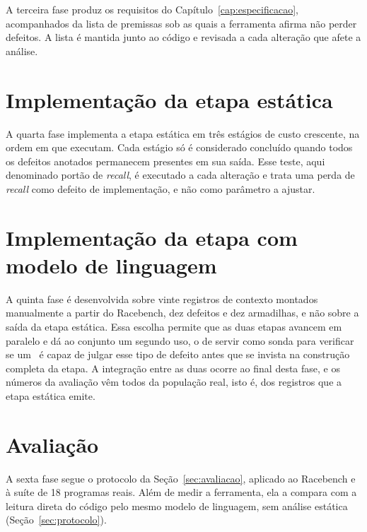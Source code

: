 A terceira fase produz os requisitos do Capítulo~\ref{cap:especificacao},
acompanhados da lista de premissas sob as quais a ferramenta afirma não perder
defeitos. A lista é mantida junto ao código e revisada a cada alteração que
afete a análise.

\section{Implementação da etapa estática}
\label{sec:fase-estatica}

A quarta fase implementa a etapa estática em três estágios de custo crescente,
na ordem em que executam. Cada estágio só é considerado concluído quando todos
os defeitos anotados permanecem presentes em sua saída. Esse teste, aqui
denominado portão de \textit{recall}, é executado a cada alteração e trata uma perda de
\textit{recall} como defeito de implementação, e não como parâmetro a ajustar.

\section{Implementação da etapa com modelo de linguagem}
\label{sec:fase-llm}

A quinta fase é desenvolvida sobre vinte registros de contexto montados
manualmente a partir do Racebench, dez defeitos e dez armadilhas, e não sobre a
saída da etapa estática. Essa escolha permite que as duas etapas avancem em
paralelo e dá ao conjunto um segundo uso, o de servir como sonda para verificar
se um \llm\ é capaz de julgar esse tipo de defeito antes que se invista na
construção completa da etapa. A integração entre as duas ocorre ao final desta
fase, e os números da avaliação vêm todos da população real, isto é, dos
registros que a etapa estática emite.

\section{Avaliação}
\label{sec:fase-avaliacao}

A sexta fase segue o protocolo da Seção~\ref{sec:avaliacao}, aplicado ao
Racebench e à suíte de 18 programas reais. Além de medir a ferramenta, ela a
compara com a leitura direta do código pelo mesmo modelo de linguagem, sem
análise estática (Seção~\ref{sec:protocolo}).
